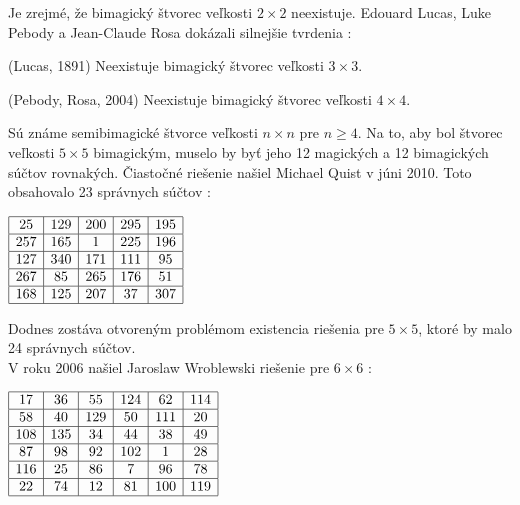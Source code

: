Je zrejmé, že bimagický štvorec veľkosti $2 \times 2$ neexistuje. Edouard Lucas, Luke Pebody a Jean-Claude Rosa dokázali silnejšie tvrdenia \cite{multimagie}:

\begin{theorem} (Lucas, 1891) Neexistuje bimagický štvorec veľkosti $3 \times 3$.
\end{theorem}

\begin{theorem} (Pebody, Rosa, 2004) Neexistuje bimagický štvorec veľkosti $4 \times 4$.
\end{theorem}

Sú známe semibimagické štvorce veľkosti $n \times n$ pre $n \geq 4$. Na to, aby bol štvorec veľkosti $5 \times 5$ bimagickým, muselo by byť jeho 12 magických a 12 bimagických súčtov rovnakých. Čiastočné riešenie našiel Michael Quist v júni 2010. Toto obsahovalo 23 správnych súčtov \cite{multimagie}:

\begin{center}
$\begin{array}{ |c|c|c|c|c| }
\hline
25 & 129 & 200 & 295 & 195 \\ 
\hline
257 & 165 & 1 & 225 & 196  \\ 
\hline
127 & 340 & 171 & 111 & 95 \\ 
\hline
267 & 85 & 265 & 176 & 51 \\ 
\hline
168 & 125 & 207 & 37 & 307 \\
\hline
\end{array}$
\end{center}

Dodnes zostáva otvoreným problémom existencia riešenia pre $5 \times 5$, ktoré by malo 24 správnych súčtov. \\

V roku 2006 našiel Jaroslaw Wroblewski riešenie pre $6 \times 6$ \cite{multimagie}:

\begin{center}
$\begin{array}{ |c|c|c|c|c|c| } 
\hline
17 & 36 & 55 & 124 & 62 & 114 \\ 
\hline
58 & 40 & 129 & 50 & 111 & 20 \\ 
\hline
108 & 135 & 34 & 44 & 38 & 49 \\
\hline
87 & 98 & 92 & 102 & 1 & 28 \\
\hline
116 & 25 & 86 & 7 & 96 & 78 \\
\hline
22 & 74 & 12 & 81 & 100 & 119 \\
\hline
\end{array}$
\end{center}

